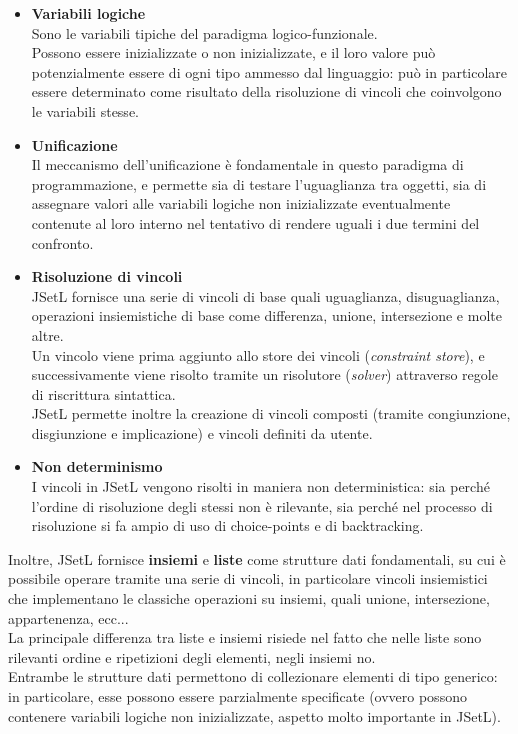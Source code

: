 \begin{itemize}
\item \textbf{Variabili logiche}\\ Sono le variabili tipiche del paradigma logico-funzionale.\\
Possono essere inizializzate o non inizializzate, e il loro valore può potenzialmente essere di ogni tipo ammesso dal linguaggio: può in particolare essere determinato come risultato della risoluzione di vincoli che coinvolgono le variabili stesse.\\

\item \textbf{Unificazione}\\ Il meccanismo dell'unificazione è fondamentale in questo paradigma di programmazione, e permette sia di testare l'uguaglianza tra oggetti, sia di assegnare valori alle variabili logiche non inizializzate eventualmente contenute al loro interno nel tentativo di rendere uguali i due termini del confronto.\\

\clearpage

\item \textbf{Risoluzione di vincoli}\\ JSetL fornisce una serie di vincoli di base quali uguaglianza, disuguaglianza, operazioni insiemistiche di
base come differenza, unione, intersezione e molte altre.\\ 
Un vincolo viene prima aggiunto allo store dei vincoli (\emph{constraint store}), e successivamente viene risolto tramite un risolutore (\emph{solver}) attraverso regole di riscrittura sintattica.\\
JSetL permette inoltre la creazione di vincoli composti (tramite congiunzione, disgiunzione e implicazione) e vincoli definiti da utente.\\

\item \textbf{Non determinismo}\\ I vincoli in JSetL vengono risolti in maniera non deterministica: sia perché l'ordine di risoluzione degli stessi non è rilevante, sia perché nel processo di risoluzione si fa ampio di uso di choice-points e di backtracking.\\

\end{itemize}

Inoltre, JSetL fornisce \textbf{insiemi} e \textbf{liste} come strutture dati fondamentali, su cui è possibile operare tramite una serie di vincoli, in particolare vincoli insiemistici che implementano le classiche operazioni su insiemi, quali unione, intersezione, appartenenza, ecc...\\ La principale differenza tra liste e insiemi risiede nel fatto che nelle liste sono rilevanti ordine e ripetizioni degli elementi, negli insiemi no.\\
Entrambe le strutture dati permettono di collezionare elementi di tipo generico: in particolare, esse possono essere parzialmente specificate (ovvero possono contenere variabili logiche non inizializzate, aspetto molto importante in JSetL).\\

